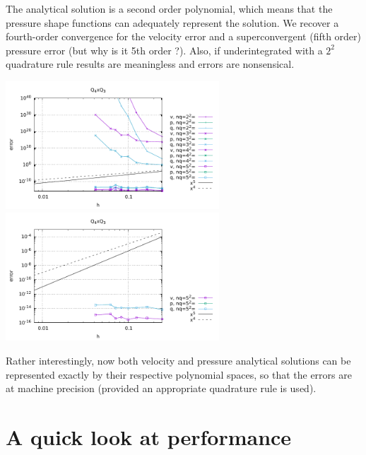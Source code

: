 The analytical solution is a second order polynomial, which means that the pressure 
shape functions can adequately represent the solution. We recover a fourth-order 
convergence for the velocity error and a superconvergent (fifth order) pressure error 
(but why is it 5th order ?).
Also, if underintegrated with a $2^2$ quadrature rule results are meaningless
and errors are nonsensical.

\begin{center}
\includegraphics[width=8cm]{python_codes/fieldstone_48/results/errors4.pdf}
\includegraphics[width=8cm]{python_codes/fieldstone_48/results/errors4_b.pdf}\\
\end{center}

Rather interestingly, now both velocity and pressure analytical solutions 
can be represented exactly by their respective polynomial spaces, so that 
the errors are at machine precision (provided an appropriate quadrature rule is used).

\newpage
\section*{A quick look at performance}

